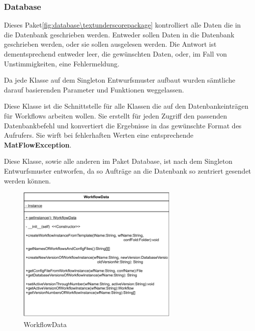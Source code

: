 \subsubsection{\label{database} Database}

Dieses Paket\ref{fig:database\textunderscorepackage}  kontrolliert alle Daten die in die Datenbank geschrieben werden.
Entweder sollen Daten in die Datenbank geschrieben werden, oder sie sollen ausgelesen werden. Die Antwort ist dementsprechend entweder leer, die gewünschten Daten, oder, im Fall von Unstimmigkeiten, eine Fehlermeldung.

Da jede Klasse auf dem Singleton Entwurfsmuster aufbaut wurden sämtliche darauf basierenden Parameter und Funktionen weggelassen.


Diese Klasse ist die Schnittstelle für alle Klassen die auf den Datenbankeinträgen für Workflows arbeiten wollen. Sie erstellt für jeden Zugriff den passenden Datenbankbefehl und konvertiert die Ergebnisse in das gewünschte Format des Aufrufers.
Sie wirft bei fehlerhaften Werten eine entsprechende \textbf{MatFlowException}.

Diese Klasse, sowie alle anderen im Paket Database, ist nach dem Singleton Entwurfsmuster entworfen, da so Aufträge an die Datenbank so zentriert gesendet werden können.
\begin{figure}[h]
	\centering
	\includegraphics[width=0.7\textwidth]{res/Klassen/WorkflowData.pdf} 
	\caption{WorkflowData}
	\label{fig:workflowDataClass}
\end{figure}

